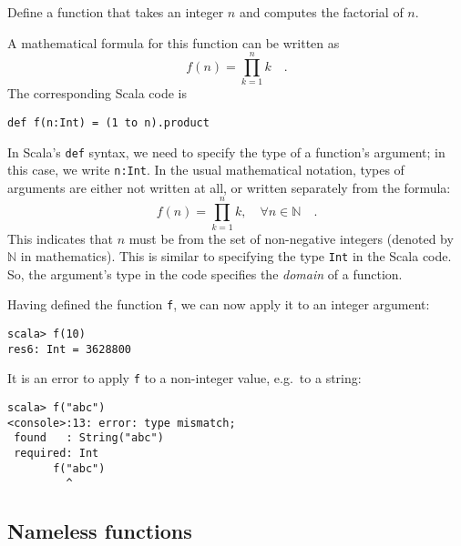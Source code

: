 Define a function that takes an integer $n$ and computes the factorial
of $n$.

A mathematical formula for this function can be written as
\[
f\left(n\right)=\prod_{k=1}^{n}k\quad.
\]
The corresponding Scala code is
\begin{lstlisting}
def f(n:Int) = (1 to n).product
\end{lstlisting}

In Scala's \texttt{}\lstinline!def! syntax, we need to specify the
type of a function's argument; in this case, we write \lstinline!n:Int!.
In the usual mathematical notation, types of arguments are either
not written at all, or written separately from the formula:
\[
f(n)=\prod_{k=1}^{n}k,\quad\forall n\in\mathbb{N}\quad.
\]
This indicates that $n$ must be from the set of non-negative integers
(denoted by $\mathbb{N}$ in mathematics). This is similar to specifying
the type \texttt{}\lstinline!Int! in the Scala code. So, the argument's
type in the code specifies the \emph{domain} of a function.

Having defined the function \lstinline!f!, we can now apply it to
an integer argument: 
\begin{lstlisting}
scala> f(10)
res6: Int = 3628800
\end{lstlisting}
It is an error to apply \lstinline!f! to a non-integer value, e.g.\ to
a string:
\begin{lstlisting}
scala> f("abc")
<console>:13: error: type mismatch;
 found   : String("abc")
 required: Int
       f("abc")
         ^ 
\end{lstlisting}


\subsection{Nameless functions\label{subsec:Nameless-functions}}

